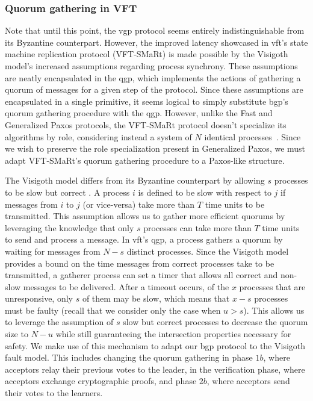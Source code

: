 \subsubsection{Quorum gathering in VFT}
Note that until this point, the \acrshort{vgp} protocol seems entirely indistinguishable from its Byzantine counterpart. However, the improved latency showcased in \acrshort{vft}'s state machine replication protocol (VFT-SMaRt) is made possible by the Visigoth model's increased assumptions regarding process synchrony. These assumptions are neatly encapsulated in the \acrfull{qgp}, which implements the actions of gathering a quorum of messages for a given step of the protocol. Since these assumptions are encapsulated in a single primitive, it seems logical to simply substitute \acrshort{bgp}'s quorum gathering procedure with the \acrshort{qgp}. However, unlike the Fast and Generalized Paxos protocols, the VFT-SMaRt protocol doesn't specialize its algorithms by role, considering instead a system of $N$ identical processes~\cite{Porto2015}. Since we wish to preserve the role specialization present in Generalized Paxos, we must adapt VFT-SMaRt's quorum gathering procedure to a Paxos-like structure.\par
The Visigoth model differs from its Byzantine counterpart by allowing $s$ processes to be slow but correct \cite{Porto2015}. A process $i$ is defined to be slow with respect to $j$ if messages from $i$ to $j$ (or vice-versa) take more than $T$ time units to be transmitted. This assumption allows us to gather more efficient quorums by leveraging the knowledge that only $s$ processes can take more than $T$ time units to send and process a message. In \acrshort{vft}'s \acrfull{qgp}, a process gathers a quorum by waiting for messages from $N-s$ distinct processes. Since the Visigoth model provides a bound on the time messages from correct processes take to be transmitted, a gatherer process can set a timer that allows all correct and non-slow  messages to be delivered. After a timeout occurs, of the $x$ processes that are unresponsive, only $s$ of them may be slow, which means that $x-s$ processes must be faulty (recall that we consider only the case when $u>s$). This allows us to leverage the assumption of $s$ slow but correct processes to decrease the quorum size to $N-u$ while still guaranteeing the intersection properties necessary for safety. We make use of this mechanism to adapt our \acrlong{bgp} protocol to the Visigoth fault model. This includes changing the quorum gathering in phase $1b$, where acceptors relay their previous votes to the leader, in the verification phase, where acceptors exchange cryptographic proofs, and phase $2b$, where acceptors send their votes to the learners. \par
